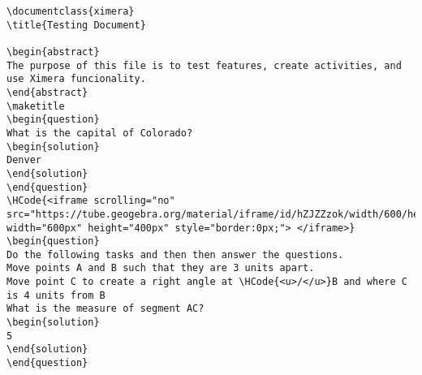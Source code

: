 \begin{Verbatim}
\documentclass{ximera}
\title{Testing Document}

\begin{abstract}
The purpose of this file is to test features, create activities, and use Ximera funcionality.
\end{abstract}
\maketitle
\begin{question}
What is the capital of Colorado?
\begin{solution}
Denver
\end{solution}
\end{question}
\HCode{<iframe scrolling="no" src="https://tube.geogebra.org/material/iframe/id/hZJZZzok/width/600/height/400/border/888888/rc/false/ai/false/sdz/true/smb/false/stb/false/stbh/true/ld/false/sri/true/at/auto" width="600px" height="400px" style="border:0px;"> </iframe>}
\begin{question}
Do the following tasks and then then answer the questions.
Move points A and B such that they are 3 units apart.
Move point C to create a right angle at \HCode{<u>/</u>}B and where C is 4 units from B
What is the measure of segment AC?
\begin{solution}
5
\end{solution}
\end{question}

\end{Verbatim}
